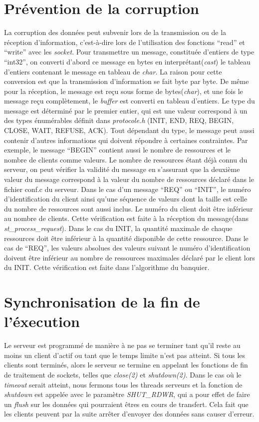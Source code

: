 \documentclass[letterpaper,12pt]{scrartcl}
\begin{document}
	\section{Prévention de la corruption}
	La corruption des données peut subvenir lors de la transmission ou de la réception d'information,
	c'est-à-dire lors de l'utilisation des fonctions ``read'' et ``write'' avec les \emph{socket}.
	Pour transmettre un message, constituée d'entiers de type ``int32'', on converti d'abord ce message en bytes en interprétant(\emph{cast})
	le tableau d'entiers contenant le message en tableau de \emph{char}. La raison pour cette conversion est que la transmission d'information se fait byte par byte.
	De même pour la réception, le message est reçu sous forme de bytes(\emph{char}), et une fois le message reçu complètement,
	le \emph{buffer} est converti en tableau d'entiers.
	Le type du message est déterminé par le premier entier, qui est une valeur correspond à un des types énumérables définit dans \emph{protocole.h}
	(INIT, END, REQ, BEGIN, CLOSE, WAIT, REFUSE, ACK).
	Tout dépendant du type, le message peut aussi contenir d'autres informations qui doivent répondre à certaines contraintes.
	Par exemple, le message ``BEGIN'' contient aussi le nombre de ressources et le nombre de clients comme valeurs.
	Le nombre de ressources étant déjà connu du serveur, on peut vérifier la validité du message en s'assurant que la deuxième valeur du message correspond à la valeur du nombre de ressources déclaré dans le fichier conf.c du serveur.
	Dans le cas d'un message ``REQ'' ou ``INIT'', le numéro d'identification du client ainsi qu'une séquence de valeurs dont la taille est celle du nombre de ressources sont aussi inclus.
	Le numéro du client doit être inférieur au nombre de clients. Cette vérification est faite à la réception du message(dans \emph{st\_process\_request}).
	Dans le cas du INIT, la quantité maximale de chaque ressources doit être inférieur à la quantité disponible de cette ressource.
	Dans le cas de ``REQ'', les valeurs absolues des valeurs suivant le numéro d'identification doivent être inférieur au nombre de ressources maximales déclaré par le client lors du INIT. Cette vérification est faite dans l'algorithme du banquier.

	\section{Synchronisation de la fin de l'éxecution}
	Le serveur est programmé de manière à ne pas se terminer tant qu'il reste au moins un client d'actif ou tant que le temps limite n'est pas atteint. Si tous les clients sont terminés, alors le serveur se termine en appelant les fonctions de fin de traitement de sockets, telles que \textit{close(2)} et \textit{shutdown(2)}. Dans le cas où le \textit{timeout} serait atteint, nous fermons tous les threads serveurs et la fonction de \textit{shutdown} est appelée avec le paramètre \textit{SHUT\_RDWR}, qui a pour effet de faire un \textit{flush} sur les données qui pourraient êtres en cours de transfert. Cela fait que les clients peuvent par la suite arrêter d'envoyer des données sans causer d'erreur.
\end{document}
